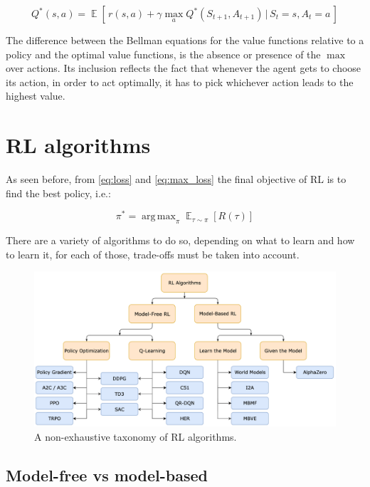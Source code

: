 \documentclass{article}
\DeclareMathOperator*{\E}{\mathbb{E}}
\DeclareMathOperator*{\argmax}{arg\,max}
\begin{document}
\begin{equation}
	Q^{*}(s,a) = \E[\, {r(s,a) + \gamma \max_a {Q^{*}(S_{t+1}, A_{t+1})} \,|\, S_t = s, A_t = a} \,]
\end{equation}

The difference between the Bellman equations for the value functions relative to a policy and the optimal value functions, is the absence or presence of the $\max$ over actions. Its inclusion reflects the fact that whenever the agent gets to choose its action, in order to act optimally, it has to pick whichever action leads to the highest value.

\section{RL algorithms}
As seen before, from \autoref{eq:loss} and \autoref{eq:max_loss} the final objective of RL is to find the best policy, i.e.:

\begin{equation}
	\pi^* = \argmax_\pi \E_{\tau \sim \pi}{[R(\tau)]}
	\label{eq:objective}
\end{equation}

There are a variety of algorithms to do so, depending on what to learn and how to learn it, for each of those, trade-offs must be taken into account.

\begin{figure}[h]
	\centering
	\includegraphics[width=13cm]{rl-taxonomy.png}
	\caption{A non-exhaustive taxonomy of RL algorithms. \cite{SpinningUp2018}}
	\label{fig:rl-taxonomy}
\end{figure}


\subsection{Model-free vs model-based}
\end{document}
